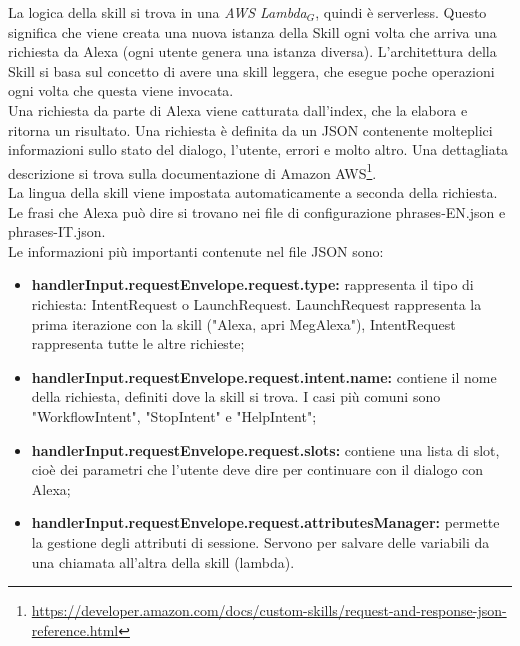 La logica della skill si trova in una \textit{AWS Lambda$_{G}$}, quindi è serverless. Questo significa che viene creata una nuova istanza della Skill ogni volta che arriva una richiesta da Alexa (ogni utente genera una istanza diversa). L'architettura della Skill si basa sul concetto di avere una skill leggera, che esegue poche operazioni ogni volta che questa viene invocata.\\
Una richiesta da parte di Alexa viene catturata dall'index, che la elabora e ritorna un risultato. Una richiesta è definita da un JSON contenente molteplici informazioni sullo stato del dialogo, l'utente, errori e molto altro. Una dettagliata descrizione si trova sulla documentazione di Amazon AWS\footnote{\url{https://developer.amazon.com/docs/custom-skills/request-and-response-json-reference.html}}.\\
La lingua della skill viene impostata automaticamente a seconda della richiesta. Le frasi che Alexa può dire si trovano nei file di configurazione phrases-EN.json e phrases-IT.json.\\
Le informazioni più importanti contenute nel file JSON sono:\label{paramsSkill}
\begin{itemize}
    \item \textbf{handlerInput.requestEnvelope.request.type:} rappresenta il tipo di richiesta: IntentRequest o LaunchRequest. LaunchRequest rappresenta la prima iterazione con la skill ("Alexa, apri MegAlexa"), IntentRequest rappresenta tutte le altre richieste;
    \item \textbf{handlerInput.requestEnvelope.request.intent.name:} contiene il nome della richiesta, definiti dove la skill si trova. I casi più comuni sono "WorkflowIntent", "StopIntent" e "HelpIntent";
    \item \textbf{handlerInput.requestEnvelope.request.slots:} contiene una lista di slot, cioè dei parametri che l'utente deve dire per continuare con il dialogo con Alexa;
    \item \textbf{handlerInput.requestEnvelope.request.attributesManager:} permette la gestione degli attributi di sessione. Servono per salvare delle variabili da una chiamata all'altra della skill (lambda).
\end{itemize}

